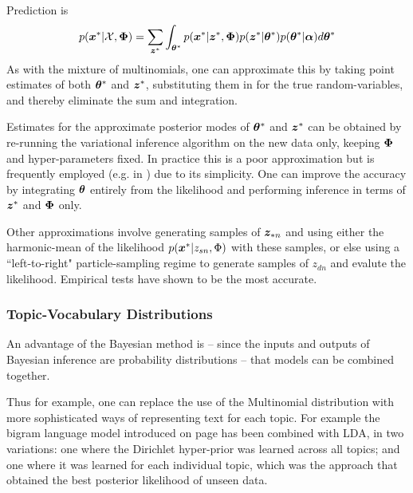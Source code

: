\label{chap1:lda-prediction}
Prediction is
\begin{align}
p({ \bm x^{*} }|{ \mathcal{X} },{ \bm \Phi }) = \sum_{\bm z^*} \int_{\bm \theta^*} p({ \bm x^{*} }|\bm z^*,{ \bm \Phi })p(\bm z^*|\bm \theta^*)p(\bm \theta^*|\bm \alpha) d\bm \theta^*
\end{align}
As with the mixture of multinomials, one can approximate this by taking point estimates of both $\bm \theta^*$ and $\bm z^*$, substituting them in for the true random-variables, and thereby eliminate the sum and integration.

Estimates for the approximate posterior modes of $\bm \theta^*$ and $\bm z^*$ can be obtained by re-running the variational inference algorithm on the new data only, keeping ${ \bm \Phi }$ and hyper-parameters fixed. In practice this is a poor approximation\cite{Wallach2009b} but is frequently employed (e.g. in \cite{Asuncion2012}) due to its simplicity. One can improve the accuracy by integrating $\bm \theta$ entirely from the likelihood and performing inference in terms of $\bm z^*$ and ${ \bm \Phi }$ only\cite{Mimno2012a}\cite{Hoffman2015}. 

Other approximations involve generating samples of $\bm z_{*n}$ and using either the harmonic-mean of the likelihood $p({ \bm x^{*} } | z_{sn},\Phi)$ with these samples\cite{Griffiths2004}\cite{Griffiths2005}\cite{Wallach2006}, or else using a ``left-to-right" particle-sampling regime\cite{Mimno2011}\cite{Mimno2012a} to generate samples of $z_{dn}$ and evalute the likelihood. Empirical tests have shown\cite{Wallach2009b} to be the most accurate.

\subsubsection*{Topic-Vocabulary Distributions}
An advantage of the Bayesian method is -- since the inputs and outputs of Bayesian inference are probability distributions -- that models can be combined together.

Thus for example, one can replace the use of the Multinomial distribution with more sophisticated ways of representing text for each topic. For example the bigram language model introduced on page \pageref{sec:chap1:mackay-lang-model} has been combined with LDA, in two variations\cite{Wallach2006}: one where the Dirichlet hyper-prior was learned across all topics; and one where it was learned for each individual topic, which was the approach that obtained the best posterior likelihood of unseen data.

